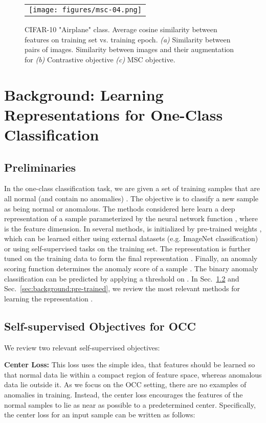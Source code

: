\documentclass[letterpaper]{article} \usepackage{aaai23}  \usepackage{times}  \usepackage{helvet}  \usepackage{courier}  \usepackage[hyphens]{url}  \usepackage{graphicx} \usepackage{amsmath, amssymb}
\begin{document}
\begin{figure*}[t]
\centering
  \centering
    \begin{tabular}{c}
\texttt{[image: figures/msc-04.png]}
    \end{tabular}
    \caption{CIFAR-10 "Airplane" class. Average cosine similarity between features on training set vs. training epoch. \textit{(a)} Similarity between pairs of images. Similarity between images and their augmentation for \textit{(b)} Contrastive objective  \textit{(c)} MSC objective.}
    \label{fig:fail_contrastive}

\end{figure*}


\section{Background: Learning Representations for One-Class Classification}

\subsection{Preliminaries}

In the one-class classification task, we are given a set of training samples that are all normal (and contain no anomalies) . The objective is to classify a new sample  as being normal or anomalous. The methods considered here learn a deep representation of a sample parameterized by the neural network function , where  is the feature dimension. In several methods,  is initialized by pre-trained weights , which can be learned either using external datasets (e.g. ImageNet classification) or using self-supervised tasks on the training set. The representation is further tuned on the training data to form the final representation . Finally, an anomaly scoring function  determines the anomaly score of a sample . The binary anomaly classification can be predicted by applying a threshold on . In Sec.~\ref{sec:background:self} and Sec.~\ref{sec:background:pre-trained}, we review the most relevant methods for learning the representation . 

\subsection{Self-supervised Objectives for OCC}
\label{sec:background:self}

We review two relevant self-supervised objectives:

\textbf{Center Loss:} This loss uses the simple idea, that features should be learned so that normal data lie within a compact region of feature space, whereas anomalous data lie outside it. As we focus on the OCC setting, there are no examples of anomalies in training. Instead, the center loss encourages the features of the normal samples to lie as near as possible to a predetermined center. Specifically, the center loss for an input sample  can be written as follows:
\end{document}
